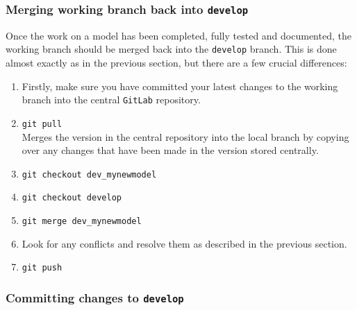 \subsubsection{Merging working branch back into \texttt{develop}}

Once the work on a model has been completed, fully tested and documented, the
working branch should be merged back into the \texttt{develop} branch. This is
done almost exactly as in the previous section, but there are a few crucial
differences:

\begin{enumerate}

\item Firstly, make sure you have committed your latest changes to the working
  branch into the central \texttt{GitLab} repository.

\item \texttt{git pull}\\
Merges the version in the central repository into the local branch by copying over any changes that have been made in the version stored centrally.

\item \texttt{git checkout dev\_mynewmodel}

\item \texttt{git checkout develop}

\item \texttt{git merge dev\_mynewmodel}

\item Look for any conflicts and resolve them as described in the previous
  section.

\item \texttt{git push}

\end{enumerate}

\subsubsection{Committing changes to \texttt{develop}}


